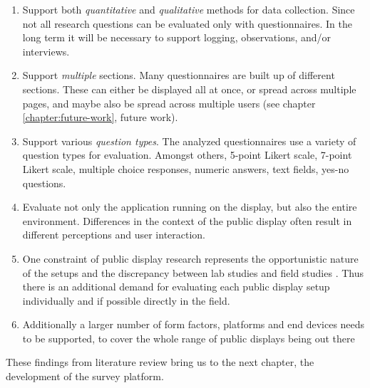 	\begin{enumerate}
		\item Support both \textit{quantitative} and \textit{qualitative} methods for data collection. Since not all research questions can be evaluated only with questionnaires. In the long term it will be necessary to support logging, observations, and/or interviews.

		\item Support \textit{multiple} sections. Many questionnaires are built up of different sections. These can either be displayed all at once, or spread across multiple pages, and maybe also be spread across multiple users (see chapter \ref{chapter:future-work}, future work).

		\item Support various \textit{question types}. The analyzed questionnaires use a variety of question types for evaluation. Amongst others, 5-point Likert scale, 7-point Likert scale, multiple choice responses, numeric answers, text fields, yes-no questions.

		\item Evaluate not only the application running on the display, but also the entire environment. Differences in the context of the public display often result in different perceptions and user interaction.

		\item One constraint of public display research represents the opportunistic nature of the setups and the discrepancy between lab studies and field studies \cite{Ojala2011}. Thus there is an additional demand for evaluating each public display setup individually and if possible directly in the field.

		\item Additionally a larger number of form factors, platforms and end devices needs to be supported, to cover the whole range of public displays being out there
	\end{enumerate}


	These findings from literature review bring us to the next chapter, the development of the survey platform.

